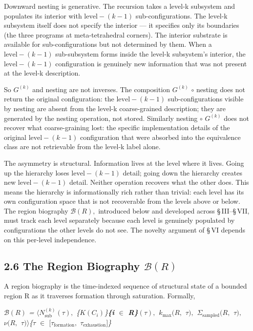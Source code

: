 \documentclass[11pt,oneside]{report}
\theoremstyle{definition}
\theoremstyle{remark}
\begin{document}
Downward nesting is generative. The recursion takes a level-k subsystem
and populates its interior with \ensuremath{\text{level}-(k-1)} sub-configurations. The
level-k subsystem itself does not specify the interior --- it specifies
only its boundaries (the three programs at meta-tetrahedral corners).
The interior substrate is available for sub-configurations but not
determined by them. When a \ensuremath{\text{level}-(k-1)} sub-subsystem forms inside the
level-k subsystem's interior, the \ensuremath{\text{level}-(k-1)} configuration is genuinely
new information that was not present at the level-k description.

So \ensuremath{G^{(k)}} and nesting are not inverses. The composition \ensuremath{G^{(k)}} \ensuremath{\circ}
nesting does not return the original configuration: the \ensuremath{\text{level}-(k-1)}
sub-configurations visible by nesting are absent from the level-k
coarse-grained description; they are generated by the nesting operation,
not stored. Similarly nesting \ensuremath{\circ} \ensuremath{G^{(k)}} does not recover what
coarse-graining lost: the specific implementation details of the
original \ensuremath{\text{level}-(k-1)} configuration that were absorbed into the
equivalence class are not retrievable from the level-k label alone.

The asymmetry is structural. Information lives at the level where it
lives. Going up the hierarchy loses \ensuremath{\text{level}-(k-1)} detail; going down the
hierarchy creates new \ensuremath{\text{level}-(k-1)} detail. Neither operation recovers
what the other does. This means the hierarchy is informationally rich
rather than trivial: each level has its own configuration space that is
not recoverable from the levels above or below. The region biography
\ensuremath{\mathcal{B}(R),} introduced below and developed across \S\,III--\S\,VII, must track each
level separately because each level is genuinely populated by
configurations the other levels do not see. The novelty argument of \S\,VI
depends on this per-level independence.

\subsection*{2.6 The Region Biography \ensuremath{\mathcal{B}(R)}}

A region biography is the time-indexed sequence of structural state of a
bounded region R as it traverses formation through saturation. Formally,

\emph{\ensuremath{\mathcal{B}(R)} = \ensuremath{\langle N_{\mathrm{sub}}^{(k)}(\tau ),} \{\ensuremath{K(C_{i})}\}\textbf{\{i \ensuremath{\in} R\}\ensuremath{(\tau ),}
\ensuremath{k_{\mathrm{max}}(R,} \ensuremath{\tau ),} \ensuremath{\Sigma_{\mathrm{sampled}}(R,} \ensuremath{\tau ),} \ensuremath{\nu (R,} \ensuremath{\tau )\rangle}}\{\ensuremath{\tau} \ensuremath{\in} \ensuremath{[\tau_{\mathrm{formation}},}
\ensuremath{\tau_{\mathrm{exhaustion}}]}\}}
\end{document}
